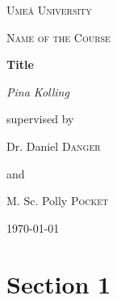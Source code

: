 \documentclass[a4]{scrartcl}
\begin{document}
	
	\begin{titlepage}
		\centering
		{\scshape\LARGE Umeå University \par}
		\vspace{1cm}
		{\scshape\Large Name of the Course \par }
		\vspace{1.5cm}
		{\huge\bfseries  Title \par}
		\vspace{2cm}
		{\Large\itshape Pina Kolling\par}
		\vfill
		supervised by \par 
		\vspace{1cm}
		Dr. Daniel \textsc{Danger} \par 
		and \par 
		M. Sc. Polly \textsc{Pocket} 
		
		\vfill
		
		{\large \today\par}
	\end{titlepage}
	
	\setcounter{page}{1}
	
	\begin{doublespace}
		\tableofcontents
	\end{doublespace}

	
	\newpage
	
	
	
	

	\section{Section 1} \label{sec:1}




	

	
	\newpage
	\begin{spacing}{0.9}
		\printbibliography
	\end{spacing}


	
	
	
	
	
	
\end{document}
